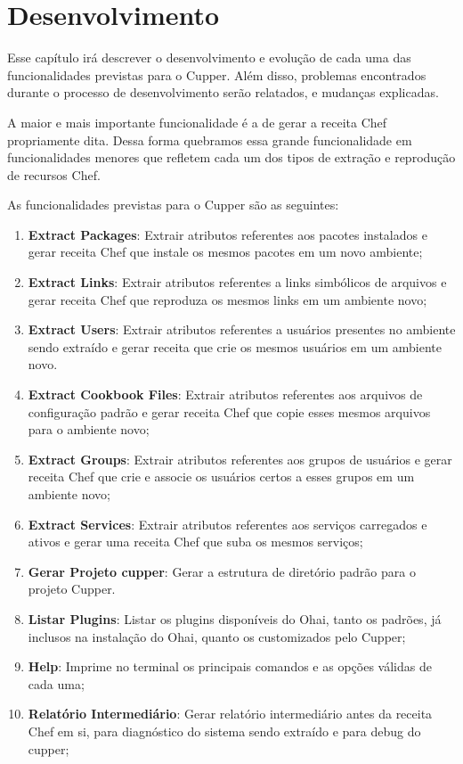 \newpage\null\thispagestyle{empty}\newpage
\chapter{Desenvolvimento}
\label{chap:dev}

Esse capítulo irá descrever o desenvolvimento e evolução de cada uma das funcionalidades
previstas para o Cupper. Além disso, problemas encontrados durante o processo
de desenvolvimento serão relatados, e mudanças explicadas.

A maior e mais importante funcionalidade é a de gerar a receita Chef propriamente dita.
Dessa forma quebramos essa grande funcionalidade em funcionalidades menores que refletem cada
um dos tipos de extração e reprodução de recursos Chef.

As funcionalidades previstas para o Cupper são as seguintes:

\begin{enumerate}
  \item \textbf{Extract Packages}: Extrair atributos referentes aos pacotes
instalados e gerar receita Chef que instale os mesmos pacotes em um novo ambiente;
  \item \textbf{Extract Links}: Extrair atributos referentes a links simbólicos
de arquivos e gerar receita Chef que reproduza os mesmos links em um ambiente novo;
  \item \textbf{Extract Users}: Extrair atributos referentes a usuários presentes
no ambiente sendo extraído e gerar receita que crie os mesmos usuários em um
ambiente novo.
  \item \textbf{Extract Cookbook Files}: Extrair atributos referentes aos arquivos
de configuração padrão e gerar receita Chef que copie esses mesmos arquivos para o ambiente novo;
  \item \textbf{Extract Groups}: Extrair atributos referentes aos grupos de usuários
e gerar receita Chef que crie e associe os usuários certos a esses grupos em um
ambiente novo;
  \item \textbf{Extract Services}: Extrair atributos referentes aos serviços carregados
e ativos e gerar uma receita Chef que suba os mesmos serviços;
  \item \textbf{Gerar Projeto cupper}: Gerar a estrutura de diretório padrão 
para o projeto Cupper.
  \item \textbf{Listar Plugins}: Listar os plugins disponíveis do Ohai, tanto 
os padrões, já inclusos na instalação do Ohai, quanto os customizados pelo Cupper;
  \item \textbf{Help}: Imprime no terminal os principais comandos e as opções
válidas de cada uma;
  \item \textbf{Relatório Intermediário}: Gerar relatório intermediário antes
da receita Chef em si, para diagnóstico do sistema sendo extraído e para debug
do cupper;

\end{enumerate}

